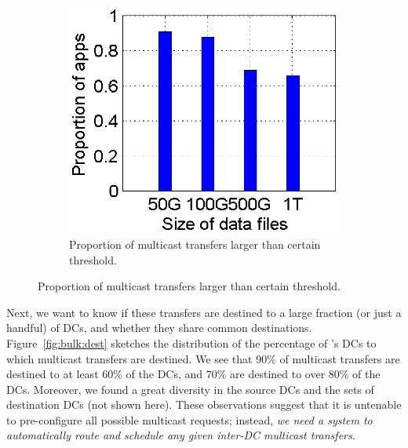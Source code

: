 \begin{figure}[t]
\begin{subfigure}[b]{0.23\textwidth}
                \includegraphics[width=\textwidth]{images/DataSize_v2.eps}
                \caption{Proportion of multicast transfers larger than certain threshold.}
                \label{fig:bulk:size}
        \end{subfigure}
        \label{fig:bulk}
\end{figure}

Next, we want to know if these transfers are destined to a large
fraction (or just a handful) of DCs, and whether they share common
destinations. Figure~\ref{fig:bulk:dest} sketches the distribution
of the percentage of \company's DCs to which multicast transfers
are destined. We see that 90\% of multicast transfers are destined to
at least 60\% of the DCs, and 70\% are destined to over 80\% of the DCs. Moreover,
we found a great diversity in the source DCs and the sets of destination
DCs (not shown here). These observations suggest that it is untenable
to pre-configure all possible multicast requests; instead, {\em we
need a system to automatically route and schedule any given inter-DC
multicast transfers.}

